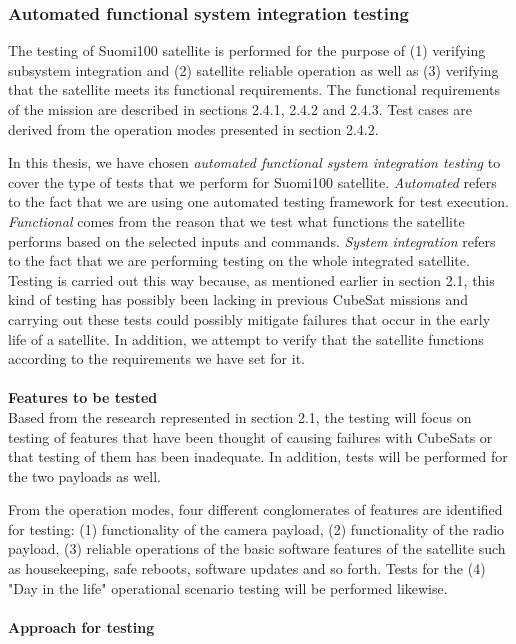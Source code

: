 \documentclass[english,12pt,a4paper,pdftex,elec,utf8]{aaltothesis}
\begin{document}
\subsubsection{Automated functional system integration testing}
The testing of Suomi100 satellite is performed for the purpose of (1) verifying subsystem integration and (2) satellite reliable operation as well as (3) verifying that the satellite meets its functional requirements. The functional requirements of the mission are described in 
sections 2.4.1, 2.4.2 and 2.4.3. Test cases are derived from the operation modes presented in section 2.4.2.\par 
In this thesis, we have chosen \textit{automated functional system integration testing} to cover the type of tests that we perform for Suomi100 satellite. \textit{Automated} refers to the fact that we are using one automated testing framework for test execution. \textit{Functional} comes from the reason that we test what functions the satellite performs based on the selected inputs and commands. \textit{System integration} refers to the fact that we are performing testing on the whole integrated satellite. Testing is carried out this way because, as mentioned earlier in section 2.1, this kind of testing has possibly been lacking in previous CubeSat missions and carrying out these tests could possibly mitigate failures that occur in the early life of a satellite. In addition, we attempt to verify that the satellite functions according to the requirements we have set for it.
\\
\\
\textbf{Features to be tested} 
\\
Based from the research represented in section 2.1, the testing will focus on testing of features that have been thought of causing failures with CubeSats or that testing of them has been inadequate. In addition, tests will be performed for the two payloads as well.\par
From the operation modes, four different conglomerates of features are identified for testing: (1) functionality of the camera payload, (2) functionality of the radio payload, (3) reliable operations of the basic software features of the satellite such as housekeeping, safe reboots, software updates and so forth. Tests for the (4) "Day in the life" operational scenario testing will be performed likewise.
\\
\\
\textbf{Approach for testing} 
\\
\end{document}
